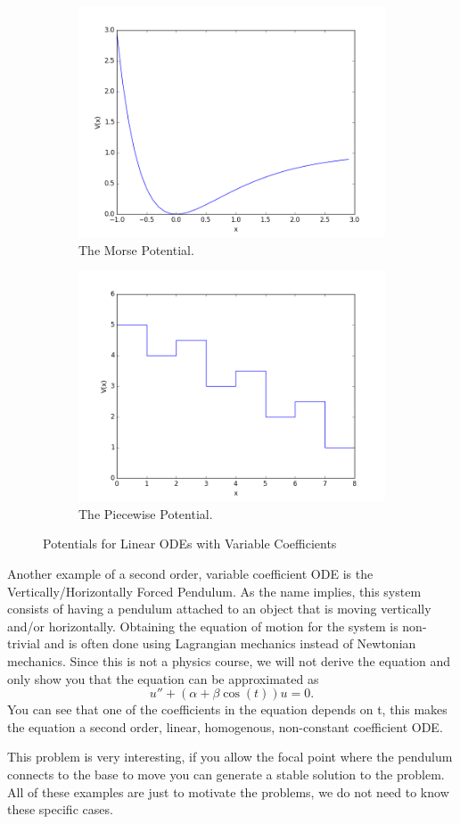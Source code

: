\documentclass{article}
\newcommand{\be}{\begin{equation}}
\newcommand{\ee}{\end{equation}}
\begin{document}
\begin{figure}[H]
    \centering
    \begin{subfigure}[b]{0.49\textwidth}
        \includegraphics[width=\textwidth]{Figures/morse.png}
  	\caption{The Morse Potential.} 
    \end{subfigure}
    \begin{subfigure}[b]{0.49\textwidth}
        \includegraphics[width=\textwidth]{Figures/piecewise.png}
        \caption{The Piecewise Potential.}
    \end{subfigure}
    \caption{Potentials for Linear ODEs with Variable Coefficients}
\end{figure}

Another example of a second order, variable coefficient ODE is the Vertically/Horizontally Forced Pendulum.
As the name implies, this system consists of having a pendulum attached to an object that is moving vertically and/or horizontally. 
Obtaining the equation of motion for the system is non-trivial and is often done using Lagrangian mechanics instead of Newtonian mechanics.
Since this is not a physics course, we will not derive the equation and only show you that the equation can be approximated as
\be
u'' + (\alpha + \beta\cos(t)) u = 0 .
\ee
You can see that one of the coefficients in the equation depends on t, this makes the equation a second order, linear, homogenous, non-constant coefficient ODE.

This problem is very interesting, if you allow the focal point where the pendulum connects to the base to move you can generate a stable solution to the problem.
All of these examples are just to motivate the problems, we do not need to know these specific cases.
\end{document}

